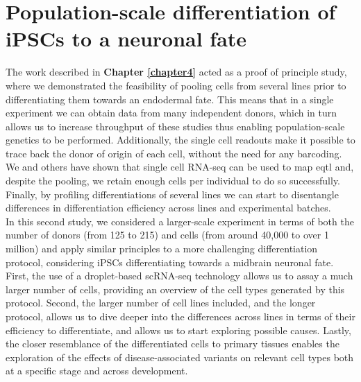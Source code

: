 
\chapter{Population-scale differentiation of iPSCs to a neuronal fate}
\label{chapter5}

The work described in \textbf{Chapter \ref{chapter4}} acted as a proof of principle study, where we demonstrated the feasibility of pooling cells from several lines prior to differentiating them towards an endodermal fate.
This means that in a single experiment we can obtain data from many independent donors, which in turn allows us to increase throughput of these studies thus enabling population-scale genetics to be performed.
Additionally, the single cell readouts make it possible to trace back the donor of origin of each cell, without the need for any barcoding.
We and others have shown that single cell RNA-seq can be used to map \gls{eqtl} and, despite the pooling, we retain enough cells per individual to do so successfully.
Finally, by profiling differentiations of several lines we can start to disentangle differences in differentiation efficiency across lines and experimental batches. \\

In this second study, we considered a larger-scale experiment in terms of both the number of donors (from 125 to 215) and cells (from around 40,000 to over 1 million) and apply similar principles to a more challenging differentiation protocol, considering iPSCs differentiating towards a midbrain neuronal fate.
First, the use of a droplet-based scRNA-seq technology allows us to assay a much larger number of cells, providing an overview of the cell types generated by this protocol. 
Second, the larger number of cell lines included, and the longer protocol, allows us to dive deeper into the differences across lines in terms of their efficiency to differentiate, and allows us to start exploring possible causes.
Lastly, the closer resemblance of the differentiated cells to primary tissues enables the exploration of the effects of disease-associated variants on relevant cell types both at a specific stage and across development. 

\newpage

